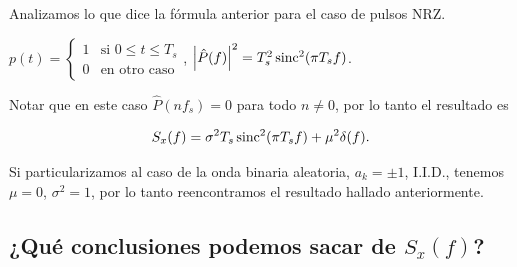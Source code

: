 Analizamos lo que dice la fórmula anterior para el caso de pulsos NRZ.

\begin{ejemplo}
    $p(t)=\begin{cases}
            1 & \text{si } 0 \leq t \leq T_s\\
            0 & \text{en otro caso}
          \end{cases}$, $\left|\hat{P}(f)\right|^2=T_s^2\operatorname{sinc}^2(\pi T_s f)$.

Notar que en este caso $\hat{P}(nf_s)=0$ para todo $n\neq 0$, por lo tanto el resultado es

\[S_x(f) = \sigma^2 T_s \operatorname{sinc}^2 (\pi T_s f) + \mu^2\delta(f).\]

    \begin{center}\begin{minipage}{\textwidth}
        \endpgfgraphicnamed\end{minipage}
    \end{center}

Si particularizamos al caso de la onda binaria aleatoria, $a_k=\pm 1$, I.I.D., tenemos
 $\mu=0$, $\sigma^2=1$, por lo tanto reencontramos el resultado hallado anteriormente.
 \end{ejemplo}



\subsection*{¿Qué conclusiones podemos sacar de $S_x(f)$?}

